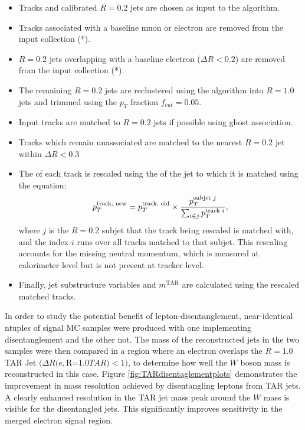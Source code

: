 \begin{itemize}
  \item Tracks and calibrated \akt $R=0.2$ jets are chosen as input to the algorithm.
  \item Tracks associated with a baseline muon or electron are removed from the input collection (*).
  \item \akt $R=0.2$ jets overlapping with a baseline electron ($\Delta R<0.2$) are removed from the input collection (*).
  \item The remaining \akt $R=0.2$ jets are reclustered using the \akt algorithm into $R=1.0$ jets and trimmed using the $p_T$ fraction \(f_{cut}=0.05\).
  \item Input tracks are matched to $R=0.2$ jets if possible using ghost association.
  \item Tracks which remain unassociated are matched to the nearest \akt $R=0.2$ jet within $\Delta R<0.3$
  \item The \pT of each track is rescaled using the \pT of the jet to which it is matched using the equation:
  \begin{equation}
  p_T^{\text{track, new}} = p_T^{\text{track, old}}\times \frac{p_T^{\text{subjet $j$}}}{\sum_{i \in j} p_T^{\text{track $i$}}} ,
  \label{eq:TAR_rescale}
  \end{equation}  where $j$ is the $R=0.2$ subjet that the track being rescaled is matched with, and the index $i$ runs over all tracks matched to that subjet. This rescaling accounts for the missing neutral momentum, which is measured at calorimeter level but is not present at tracker level.
  \item Finally, jet substructure variables and  $m^\text{TAR}$ are calculated using the rescaled matched tracks.
\end{itemize}

In order to study the potential benefit of lepton-disentanglement, near-identical ntuples of signal MC samples were produced with one implementing disentanglement and the other not.
The mass of the reconstructed jets in the two samples were then compared in a region where an electron overlaps the $R=1.0$ TAR Jet $(\Delta R(e, $R=1.0$ TAR) < 1)$, to determine how well the $W$ boson mass is reconstructed in this case.
Figure \ref{fig:TARdisentaglementplots} demonstrates the improvement in mass resolution achieved by disentangling leptons from TAR jets. A clearly enhanced resolution in the TAR jet mass peak around the $W$ mass is visible for the disentangled jets. This significantly improves sensitivity in the merged electron signal region.

